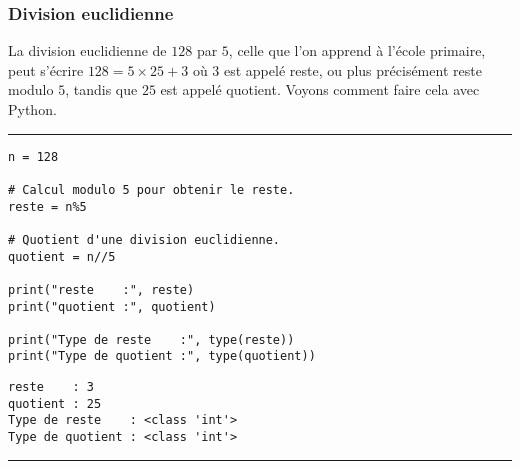 \subsubsection{Division euclidienne}

La division euclidienne de $128$ par $5$, celle que l'on apprend à l'école primaire, peut s'écrire $128 = 5 \times 25 + 3$ où $3$ est appelé reste, ou plus précisément reste modulo $5$, tandis que $25$ est appelé quotient. Voyons comment faire cela avec Python.


\bigskip
{\hrule height .5mm}
\begin{verbatim}
n = 128

# Calcul modulo 5 pour obtenir le reste.
reste = n%5

# Quotient d'une division euclidienne.
quotient = n//5

print("reste    :", reste)
print("quotient :", quotient)

print("Type de reste    :", type(reste))
print("Type de quotient :", type(quotient))
\end{verbatim}
 \color{ForestGreen}
\vspace{-1.5em}
\begin{verbatim}
reste    : 3
quotient : 25
Type de reste    : <class 'int'>
Type de quotient : <class 'int'>
\end{verbatim} \color{Black}
{\hrule height .5mm}
\bigskip